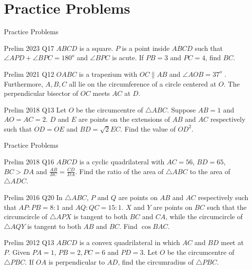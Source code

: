 \documentclass{beamer}
\begin{document}
\section{Practice Problems}
\begin{frame}{Practice Problems}
	\begin{block}{Prelim 2023 Q17}
		$ABCD$ is a square. $P$ is a point inside $ABCD$ such that $\angle APD + \angle BPC = 180^o$ and  $\angle BPC$ is acute.  If $PB = 3$ and $PC = 4$, find $BC$.
	\end{block}
	\begin{block}{Prelim 2021 Q12}
		$OABC$ is a trapezium with $OC \parallel AB$ and $\angle AOB = 37^o$	. Furthermore, $A,B,C$ all lie on the circumference of a circle centered at $O$. The perpendicular bisector of $OC$ meets $AC$ at $D$.
	\end{block}
	\begin{block}{Prelim 2018 Q13}
		Let $O$ be the circumcentre of $\triangle ABC$. Suppose $AB = 1$ and $AO = AC = 2$. $D$ and $E$ are points on the extensions of $AB$ and $A C$ respectively such that $OD = OE $ and $BD = \sqrt{2} EC$. Find the value of $OD^2$.
	\end{block}
\end{frame}
\begin{frame}{Practice Problems}
	\begin{block} {Prelim 2018 Q16}
		$ABCD$ is a cyclic quadrilateral with $AC=56$, $BD=65$, $BC>DA$ and $\frac{AB}{BC} = \frac{CD}{DA}$. Find the ratio of the area of $\triangle ABC$ to the area of $\triangle ADC$.
	\end{block}
	\begin{block} {Prelim 2016 Q20}
		In $\triangle ABC$, $P$ and $Q$ are points on $AB$ and $AC$ respectively such that $AP:PB=8:1$ and $AQ:QC=15:1$.  $X$ and $Y$ are points on $BC$ such that the circumcircle of $\triangle APX$ is tangent to both $BC$ and $CA$, while the circumcircle of  $\triangle AQY$ is tangent to both $AB$ and $BC$. Find $\cos BAC$.
	\end{block}
	\begin{block}{Prelim 2012 Q13}
		$A B C D$ is a convex quadrilateral in which $A C$ and $B D$ meet at $P$. Given $P A=1$, $P B=2, P C=6$ and $P D=3$. Let $O$ be the circumcentre of $\triangle P B C$. If $O A$ is perpendicular to $A D$, find the circumradius of $\triangle P B C$.
	\end{block}
\end{frame}
\end{document}
